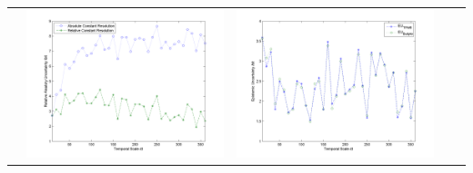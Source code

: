 \documentclass[11pt]{article}
\begin{document}
\begin{table}[H]
{\begin{tabular}{c  c   c   c c }
&\begin{minipage}{.4\textwidth}\includegraphics[width=\linewidth]{resultgraph/12459000AU.png}\end{minipage}
&\begin{minipage}{.4\textwidth}\includegraphics[width=\linewidth]{resultgraph/12459000EU.png}\end{minipage}
\\

\end{tabular}}
\end{table}
\end{document}
